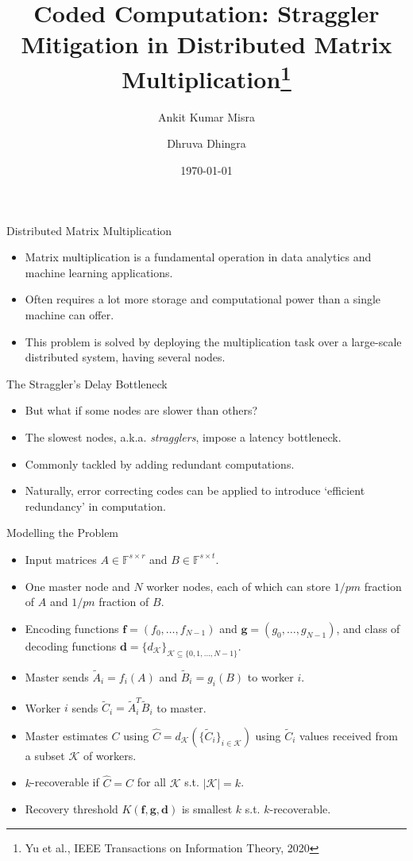 \documentclass{beamer}
\title{Coded Computation: Straggler Mitigation in Distributed Matrix Multiplication\thanks{Yu et al., IEEE Transactions on Information Theory, 2020}}
\author{Ankit Kumar Misra \and Dhruva Dhingra}
\institute{EE 605: Error Correcting Codes, \\Autumn 2022, IIT Bombay}
\date{\today}
\begin{document}
\frame{\titlepage}

\begin{frame}{Distributed Matrix Multiplication}
\begin{itemize}
    \item Matrix multiplication is a fundamental operation in data analytics and machine learning applications.
    \item Often requires a lot more storage and computational power than a single machine can offer.
    \item This problem is solved by deploying the multiplication task over a large-scale distributed system, having several nodes.
\end{itemize}
\end{frame}

\begin{frame}{The Straggler's Delay Bottleneck}
\begin{itemize}
    \item But what if some nodes are slower than others?
    \item The slowest nodes, a.k.a. \textit{stragglers}, impose a latency bottleneck.
    \item Commonly tackled by adding redundant computations.
    \item Naturally, error correcting codes can be applied to introduce `efficient redundancy' in computation.
\end{itemize}
\end{frame}

\begin{frame}{Modelling the Problem}
\begin{itemize}
    \item Input matrices $A\in \mathbb{F}^{s\times r}$ and $B\in\mathbb{F}^{s\times t}$.
    \item One master node and $N$ worker nodes, each of which can store $1/pm$ fraction of $A$ and $1/pn$ fraction of $B$.
    \item Encoding functions $\mathbf{f} = (f_0,\dots,f_{N-1})$ and $\mathbf{g} = (g_0,\dots,g_{N-1})$, and class of decoding functions $\mathbf{d} = \{d_{\mathcal{K}}\}_{\mathcal{K}\subseteq \{0,1,\dots,N-1\}}$.
    \item Master sends $\tilde{A}_i = f_i(A)$ and $\tilde{B}_i = g_i(B)$ to worker $i$.
    \item Worker $i$ sends $\tilde{C}_i = \tilde{A}^T_i\tilde{B}_i$ to master.
    \item Master estimates $C$ using $\hat{C} = d_{\mathcal{K}}(\{\tilde{C}_i\}_{i\in\mathcal{K}})$ using $\tilde{C}_i$ values received from a subset $\mathcal{K}$ of workers.
    \item $k$-recoverable if $\hat{C}=C$ for all $\mathcal{K}$ s.t. $|\mathcal{K}|=k$.
    \item Recovery threshold $K(\mathbf{f}, \mathbf{g}, \mathbf{d})$ is smallest $k$ s.t. $k$-recoverable.
\end{itemize}
\end{frame}
\end{document}
